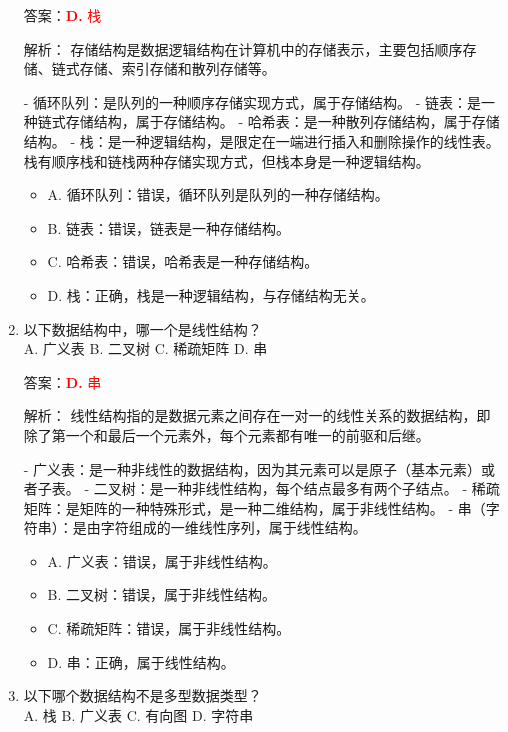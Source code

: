 \documentclass[lang=cn,newtx,10pt,scheme=chinese]{../../../elegantbook}
\begin{document}
\begin{enumerate}
    答案：\textcolor{red}{\textbf{D.} 栈}

    解析：
    存储结构是数据逻辑结构在计算机中的存储表示，主要包括顺序存储、链式存储、索引存储和散列存储等。
    
    - 循环队列：是队列的一种顺序存储实现方式，属于存储结构。
    - 链表：是一种链式存储结构，属于存储结构。
    - 哈希表：是一种散列存储结构，属于存储结构。
    - 栈：是一种逻辑结构，是限定在一端进行插入和删除操作的线性表。栈有顺序栈和链栈两种存储实现方式，但栈本身是一种逻辑结构。

    \begin{itemize}
        \item A. 循环队列：错误，循环队列是队列的一种存储结构。
        \item B. 链表：错误，链表是一种存储结构。
        \item C. 哈希表：错误，哈希表是一种存储结构。
        \item D. 栈：正确，栈是一种逻辑结构，与存储结构无关。
    \end{itemize}

    \item 以下数据结构中，哪一个是线性结构？\\
    A. 广义表 \quad B. 二叉树 \quad C. 稀疏矩阵 \quad D. 串

    答案：\textcolor{red}{\textbf{D.} 串}

    解析：
    线性结构指的是数据元素之间存在一对一的线性关系的数据结构，即除了第一个和最后一个元素外，每个元素都有唯一的前驱和后继。
    
    - 广义表：是一种非线性的数据结构，因为其元素可以是原子（基本元素）或者子表。
    - 二叉树：是一种非线性结构，每个结点最多有两个子结点。
    - 稀疏矩阵：是矩阵的一种特殊形式，是一种二维结构，属于非线性结构。
    - 串（字符串）：是由字符组成的一维线性序列，属于线性结构。

    \begin{itemize}
        \item A. 广义表：错误，属于非线性结构。
        \item B. 二叉树：错误，属于非线性结构。
        \item C. 稀疏矩阵：错误，属于非线性结构。
        \item D. 串：正确，属于线性结构。
    \end{itemize}

    \item 以下哪个数据结构不是多型数据类型？\\
    A. 栈 \quad B. 广义表 \quad C. 有向图 \quad D. 字符串


\end{enumerate}
\end{document}
